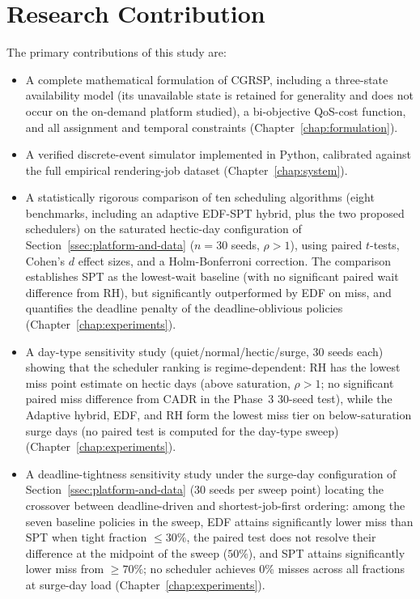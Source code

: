 \section{Research Contribution}
\label{sec:research-contribution}

The primary contributions of this study are:

\begin{itemize}

\item A complete mathematical formulation of CGRSP, including a three-state availability model (its unavailable state is retained for generality and does not occur on the on-demand platform studied), a bi-objective QoS-cost function, and all assignment and temporal constraints (Chapter~\ref{chap:formulation}).

\item A verified discrete-event simulator implemented in Python, calibrated against the full empirical rendering-job dataset (Chapter~\ref{chap:system}).

\item A statistically rigorous comparison of ten scheduling algorithms (eight benchmarks, including an adaptive EDF-SPT hybrid, plus the two proposed schedulers) on the saturated hectic-day configuration of Section~\ref{ssec:platform-and-data} ($n=30$ seeds, $\rho>1$), using paired $t$-tests, Cohen's $d$ effect sizes, and a Holm-Bonferroni correction. The comparison establishes SPT as the lowest-wait baseline (with no significant paired wait difference from RH), but significantly outperformed by EDF on miss, and quantifies the deadline penalty of the deadline-oblivious policies (Chapter~\ref{chap:experiments}).

\item A day-type sensitivity study (quiet/normal/hectic/surge, 30 seeds each) showing that the scheduler ranking is regime-dependent: RH has the lowest miss point estimate on hectic days (above saturation, $\rho>1$; no significant paired miss difference from CADR in the Phase~3 30-seed test), while the Adaptive hybrid, EDF, and RH form the lowest miss tier on below-saturation surge days (no paired test is computed for the day-type sweep) (Chapter~\ref{chap:experiments}).

\item A deadline-tightness sensitivity study under the surge-day configuration of Section~\ref{ssec:platform-and-data} (30 seeds per sweep point) locating the crossover between deadline-driven and shortest-job-first ordering: among the seven baseline policies in the sweep, EDF attains significantly lower miss than SPT when tight fraction $\leq 30\%$, the paired test does not resolve their difference at the midpoint of the sweep ($50\%$), and SPT attains significantly lower miss from $\geq 70\%$; no scheduler achieves 0\% misses across all fractions at surge-day load (Chapter~\ref{chap:experiments}).


\end{itemize}
